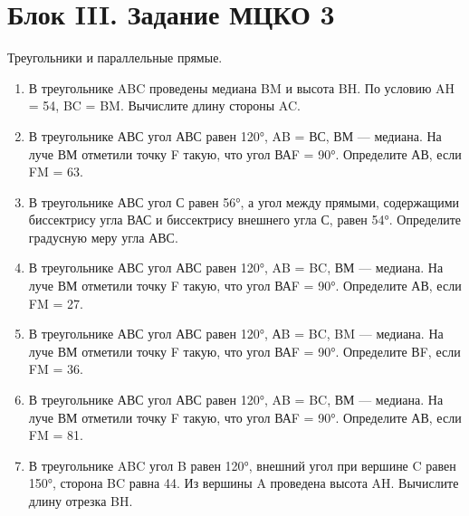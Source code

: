 \documentclass[a4paper,12pt]{article}
\newcommand{\taskspace}{\par\vspace{0.42cm}}
\newcommand{\blocknote}[1]{%
  {\color{soft}\small #1\par}\vspace{0.25cm}%
}
\begin{document}
\newpage

\section*{Блок III. Задание МЦКО 3}

\blocknote{Треугольники и параллельные прямые.}

\begin{enumerate}[resume]

\item В треугольнике ABC проведены медиана BM и высота BH. По условию AH = 54, BC = BM. Вычислите длину стороны AC.

\taskspace

\item В треугольнике АВС угол АВС равен 120°, AB = ВС, ВМ --- медиана. На луче ВМ отметили точку F такую, что угол ВАF = 90°. Определите АВ, если FM = 63.

\taskspace

\item В треугольнике АВС угол С равен 56°, а угол между прямыми, содержащими биссектрису угла ВАС и биссектрису внешнего угла С, равен 54°. Определите градусную меру угла АВС.

\taskspace

\item В треугольнике АВС угол АВС равен 120°, AB = BC, ВМ --- медиана. На луче ВМ отметили точку F такую, что угол ВАF = 90°. Определите АВ, если FM = 27.

\taskspace

\item В треугольнике АВС угол АВС равен 120°, АB = BC, BM --- медиана. На луче ВМ отметили точку F такую, что угол ВАF = 90°. Определите ВF, если FM = 36.

\taskspace

\item В треугольнике АВС угол АВС равен 120°, AB = BC, ВМ --- медиана. На луче ВМ отметили точку F такую, что угол ВАF = 90°. Определите АВ, если FM = 81.

\taskspace

\item В треугольнике ABC угол B равен 120°, внешний угол при вершине C равен 150°, сторона BC равна 44. Из вершины A проведена высота AH. Вычислите длину отрезка BH.


\end{enumerate}
\end{document}
